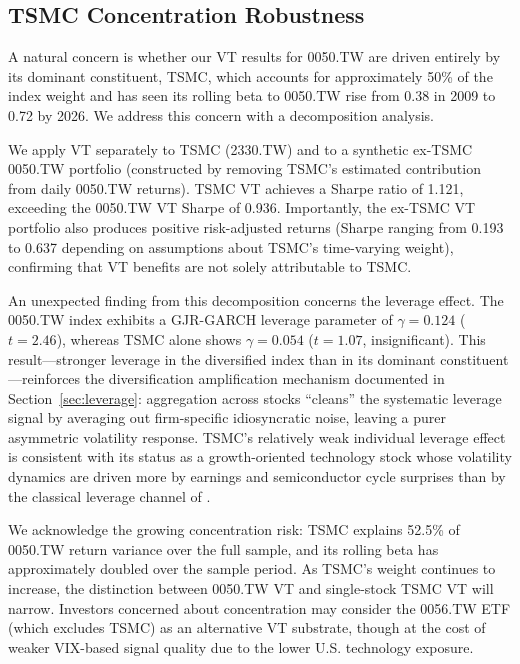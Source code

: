 \subsection{TSMC Concentration Robustness}
\label{sec:tsmc}

A natural concern is whether our VT results for 0050.TW are driven entirely by its dominant constituent, TSMC, which accounts for approximately 50\% of the index weight and has seen its rolling beta to 0050.TW rise from 0.38 in 2009 to 0.72 by 2026. We address this concern with a decomposition analysis.

We apply VT separately to TSMC (2330.TW) and to a synthetic ex-TSMC 0050.TW portfolio (constructed by removing TSMC's estimated contribution from daily 0050.TW returns). TSMC VT achieves a Sharpe ratio of 1.121, exceeding the 0050.TW VT Sharpe of 0.936. Importantly, the ex-TSMC VT portfolio also produces positive risk-adjusted returns (Sharpe ranging from 0.193 to 0.637 depending on assumptions about TSMC's time-varying weight), confirming that VT benefits are not solely attributable to TSMC.

An unexpected finding from this decomposition concerns the leverage effect. The 0050.TW index exhibits a GJR-GARCH leverage parameter of $\gamma = 0.124$ ($t = 2.46$), whereas TSMC alone shows $\gamma = 0.054$ ($t = 1.07$, insignificant). This result---stronger leverage in the diversified index than in its dominant constituent---reinforces the diversification amplification mechanism documented in Section~\ref{sec:leverage}: aggregation across stocks ``cleans'' the systematic leverage signal by averaging out firm-specific idiosyncratic noise, leaving a purer asymmetric volatility response. TSMC's relatively weak individual leverage effect is consistent with its status as a growth-oriented technology stock whose volatility dynamics are driven more by earnings and semiconductor cycle surprises than by the classical leverage channel of \citet{black1976}.

We acknowledge the growing concentration risk: TSMC explains 52.5\% of 0050.TW return variance over the full sample, and its rolling beta has approximately doubled over the sample period. As TSMC's weight continues to increase, the distinction between 0050.TW VT and single-stock TSMC VT will narrow. Investors concerned about concentration may consider the 0056.TW ETF (which excludes TSMC) as an alternative VT substrate, though at the cost of weaker VIX-based signal quality due to the lower U.S. technology exposure.

